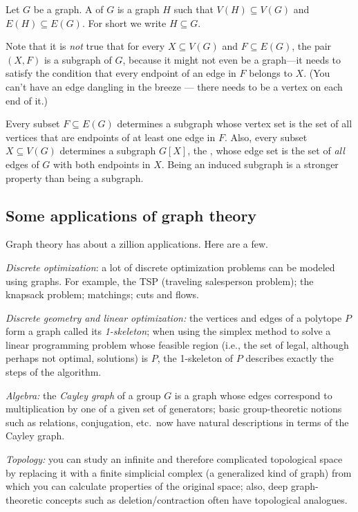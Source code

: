 \begin{definition}
Let $G$ be a graph.  A  of $G$ is a graph $H$ such that $V(H) \subseteq V(G)$ and $E(H) \subseteq E(G)$. For short we write $H \subseteq G$.
\end{definition}

Note that it is \emph{not} true that for every $X\subseteq V(G)$ and $F\subseteq E(G)$, the pair $(X,F)$ is a subgraph of $G$, because it might not even be a graph---it needs to satisfy the condition that every endpoint of an edge in $F$ belongs to $X$.  (You can't have an edge dangling in the breeze --- there needs to be a vertex on each end of it.)

Every subset $F\subseteq E(G)$ determines a subgraph whose vertex set is the set of all vertices that are endpoints of at least one edge in $F$.  Also, every subset $X\subseteq V(G)$ determines a subgraph $G[X]$, the , whose edge set is the set of \emph{all} edges of $G$ with both endpoints in $X$.  Being an induced subgraph is a stronger property than being a subgraph.


\subsection{Some applications of graph theory}
Graph theory has about a zillion applications.  Here are a few.

\emph{Discrete optimization}: a lot of discrete optimization problems can be modeled using graphs.
For example, the TSP (traveling salesperson problem); the knapsack problem; matchings; cuts and flows.

\emph{Discrete geometry and linear optimization:} the vertices and edges of a polytope $P$ form a graph called its \emph{1-skeleton}; when using the simplex method to solve a linear programming problem whose feasible region (i.e., the set of legal, although perhaps not optimal, solutions) is $P$, the 1-skeleton of $P$ describes exactly the steps of the algorithm.

\emph{Algebra:} the \emph{Cayley graph} of a group $G$ is a graph whose edges correspond to multiplication by one of a given set of generators; basic group-theoretic notions such as relations,
conjugation, etc.\ now have natural descriptions in terms of the Cayley graph.

\emph{Topology:} you can study an infinite and therefore complicated topological space by replacing it with a finite simplicial complex (a generalized kind of graph) from which you can calculate properties of the original space; also, deep graph-theoretic concepts such as deletion/contraction often have topological analogues.

